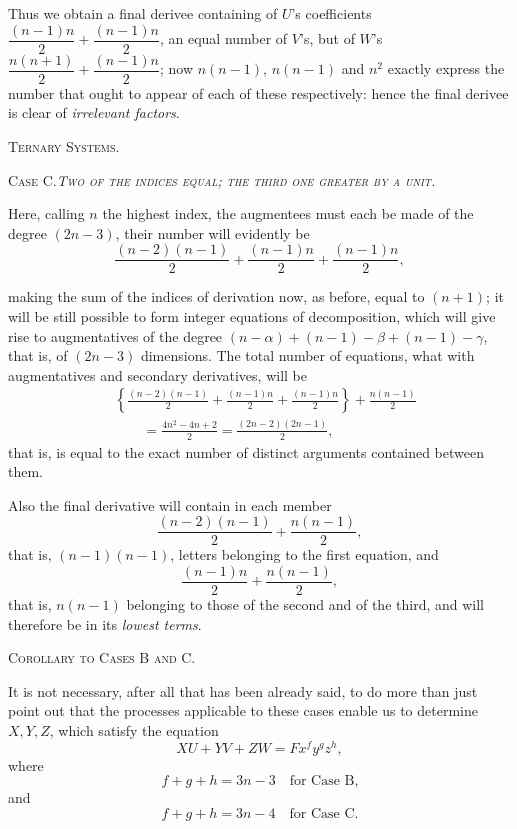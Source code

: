 \documentclass[11pt]{article}
\newcommand{\sourcepage}[1]{\marginpar{\scriptsize p.~#1}}
\begin{document}
Thus we obtain a final derivee containing of $U$'s coefficients $\dfrac{(n-1)n}{2}+\dfrac{(n-1)n}{2}$, an equal number of $V$'s, but of $W$'s $\dfrac{n(n+1)}{2}+\dfrac{(n-1)n}{2}$; now $n(n-1)$, $n(n-1)$ and $n^2$ exactly express the number that ought to appear of each of these respectively: hence the final derivee is clear of \emph{irrelevant factors}.

\begin{center}\scshape Ternary Systems.\end{center}

\begin{center}\scshape Case C.\quad \emph{Two of the indices equal; the third one greater by a unit.}\end{center}

Here, calling $n$ the highest index, the augmentees must each be made of the degree $(2n-3)$, their number will evidently be
\[
 \frac{(n-2)(n-1)}{2}+\frac{(n-1)n}{2}+\frac{(n-1)n}{2},
\]

\sourcepage{85}
making the sum of the indices of derivation now, as before, equal to $(n+1)$; it will be still possible to form integer equations of decomposition, which will give rise to augmentatives of the degree $(n-\alpha)+(n-1)-\beta+(n-1)-\gamma$, that is, of $(2n-3)$ dimensions. The total number of equations, what with augmentatives and secondary derivatives, will be
\[
\begin{aligned}
&\left\{\frac{(n-2)(n-1)}{2}+\frac{(n-1)n}{2}+\frac{(n-1)n}{2}\right\}
+\frac{n(n-1)}{2}\\
&\qquad=\frac{4n^2-4n+2}{2}
=\frac{(2n-2)(2n-1)}{2},
\end{aligned}
\]
that is, is equal to the exact number of distinct arguments contained between them.

Also the final derivative will contain in each member
\[
 \frac{(n-2)(n-1)}{2}+\frac{n(n-1)}{2},
\]
that is, $(n-1)(n-1)$, letters belonging to the first equation, and
\[
 \frac{(n-1)n}{2}+\frac{n(n-1)}{2},
\]
that is, $n(n-1)$ belonging to those of the second and of the third, and will therefore be in its \emph{lowest terms}.

\begin{center}\scshape Corollary to Cases B and C.\end{center}

It is not necessary, after all that has been already said, to do more than just point out that the processes applicable to these cases enable us to determine $X,Y,Z$, which satisfy the equation
\[
 XU+YV+ZW=Fx^f y^g z^h,
\]
where
\[
 f+g+h=3n-3 \quad\text{for Case B,}
\]
and
\[
 f+g+h=3n-4 \quad\text{for Case C.}
\]
\end{document}
